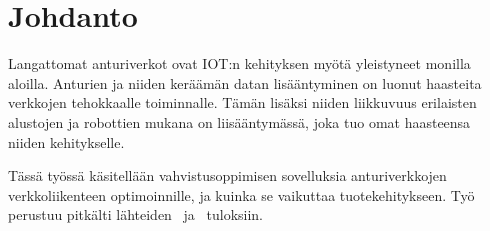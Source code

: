 \section{Johdanto}
Langattomat anturiverkot ovat IOT:n kehityksen myötä yleistyneet monilla
aloilla. Anturien ja niiden keräämän datan lisääntyminen on luonut haasteita
verkkojen tehokkaalle toiminnalle. Tämän lisäksi niiden liikkuvuus erilaisten
alustojen ja robottien mukana on liisääntymässä, joka tuo omat haasteensa
niiden kehitykselle.

Tässä työssä käsitellään vahvistusoppimisen sovelluksia anturiverkkojen
verkkoliikenteen optimoinnille, ja kuinka se vaikuttaa tuotekehitykseen. Työ
perustuu pitkälti lähteiden~\cite{Arya2015} ja~\cite{Yu2006} tuloksiin.
